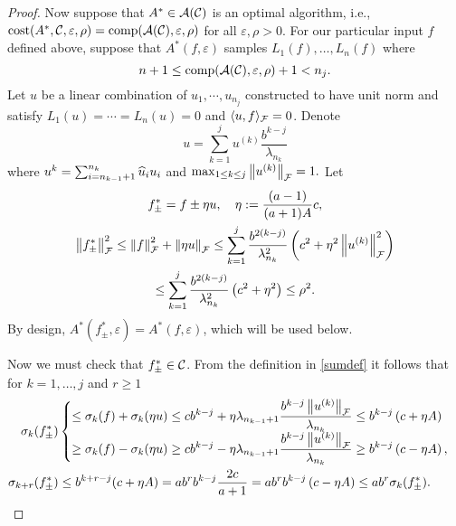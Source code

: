 \documentclass[final]{elsarticle}
\theoremstyle{definition}
\theoremstyle{remark}
\begin{document}
\begin{proof}
Now suppose that $A^* \in \ca(\cc)$ is an optimal algorithm, i.e., $\cost(A^*,\cc,\varepsilon,\rho) =  \comp(\ca(\cc),\varepsilon,\rho)$ for all $\varepsilon, \rho > 0$.  For our particular input $f$ defined above, suppose that $A^*(f,\varepsilon)$ samples $L_1(f), \ldots, L_n(f)$ where 
\[n + 1
\le \comp(\ca(\cc),\varepsilon,\rho) +1 < n_j.\]  Let $u$ be a linear combination of $u_1, \cdots, u_{n_j}$ constructed to have unit norm and satisfy $L_1(u) = \cdots = L_n(u) = 0$ and $\langle u,f \rangle_{\cf} = 0$. Denote
\[u = \sum_{k=1}^{j}u^{(k)}\frac{b^{k-j}}{\lambda_{n_k}}\]
where $u^{k}= \sum_{i = n_{k-1}+1}^{n_k} \hu_i u_i$ and
$\max_{1\le k\le j} \norm[\cf]{u^{(k)}} = 1.$
Let 
\begin{gather}
\label{etadef}
f^*_\pm = f \pm \eta u, \quad \eta : =  \frac {(a-1)}{(a+1)A}c, \\
\nonumber
\norm[\cf]{f^*_\pm}^2 \le \norm[\cf]{f}^2 + \norm[\cf]{\eta u } 
\le \sum_{k=1}^j \frac{ b^{2(k-j)}}{\lambda^2_{n_{k}}} \left(c^2+ \eta^2 \norm[\cf]{u^{(k)}}^2\right)\\
\nonumber
\le \sum_{k=1}^j \frac{ b^{2(k-j)}}{\lambda^2_{n_{k}}} \left(c^2+ \eta^2 \right)  \le \rho^2.
\end{gather} 
By design, $A^*(f^*_\pm,\varepsilon) = A^*(f,\varepsilon)$, which will be used below.

Now we must check that $f^*_\pm \in \cc$. From the definition in \eqref{sumdef} it follows that for $k = 1, \ldots, j$ and $r \ge 1$
\begin{align*}
\sigma_k(f^*_\pm) & \begin{cases} 
\displaystyle
\le \sigma_k(f) + \sigma_k(\eta u)\le 
c b^{k-j} + \eta\lambda_{n_{k-1}+1}\frac{b^{k-j}\norm[\cf]{u^{(k)} } }{\lambda_{n_k}}
\le b^{k-j}\left(c+\eta A \right) 
\\[1ex]
\displaystyle
\ge \sigma_k(f) - \sigma_k(\eta u)\ge 
c b^{k-j} - \eta\lambda_{n_{k-1}+1}\frac{b^{k-j}\norm[\cf]{u^{(k)} } }{\lambda_{n_k}}
\ge b^{k-j}\left(c-\eta A \right) , 
\end{cases}
\\
\sigma_{k+r}(f^*_\pm)&
\le b^{k+r-j}(c+\eta A) = ab^r b^{k-j}\frac{2c}{a+1}
=ab^r b^{k-j}\left(c-\eta A \right) \le a b^r \sigma_{k}(f^*_\pm).
\end{align*}


\end{proof}
\end{document}

